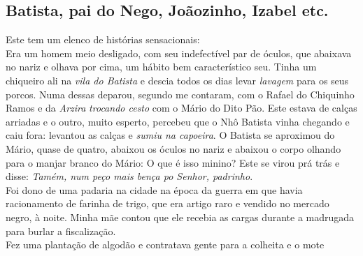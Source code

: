 \documentclass[12pt,brazil,]{book}
\begin{document}
\subsection{Batista, pai do Nego, Joãozinho, Izabel
etc.}\label{batista-pai-do-nego-jouxe3ozinho-izabel-etc.}

Este tem um elenco de histórias sensacionais:\\
Era um homem meio desligado, com seu indefectível par de óculos, que
abaixava no nariz e olhava por cima, um hábito bem característico seu.
Tinha um chiqueiro ali na \emph{vila do Batista} e descia todos os dias
levar \emph{lavagem} para os seus porcos. Numa dessas deparou, segundo
me contaram, com o Rafael do Chiquinho Ramos e da \emph{Arzira}
\emph{trocando cesto} com o Mário do Dito Pão. Este estava de calças
arriadas e o outro, muito esperto, percebeu que o Nhô Batista vinha
chegando e caiu fora: levantou as calças e \emph{sumiu na capoeira}. O
Batista se aproximou do Mário, quase de quatro, abaixou os óculos no
nariz e abaixou o corpo olhando para o manjar branco do Mário: O que é
isso minino? Este se virou prá trás e disse: \emph{Tamém, num peço mais
bença po Senhor, padrinho}.\\
Foi dono de uma padaria na cidade na época da guerra em que havia
racionamento de farinha de trigo, que era artigo raro e vendido no
mercado negro, à noite. Minha mãe contou que ele recebia as cargas
durante a madrugada para burlar a fiscalização.\\
Fez uma plantação de algodão e contratava gente para a colheita e o mote
\end{document}
